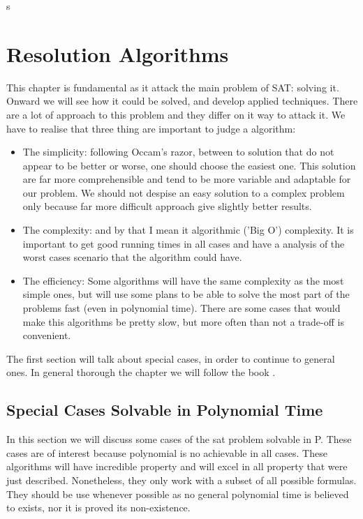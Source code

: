 
s
\chapter{Resolution Algorithms}

This chapter is fundamental as it attack the main problem of SAT: solving it. Onward we will see how it could be solved, and develop applied techniques. There are a lot of approach to this problem and they differ on it way to attack it. We have to realise that three thing are important to judge a algorithm:

\begin{itemize}
\item The simplicity: following Occam's razor, between to solution that do not appear to be better or worse, one should choose the easiest one. This solution are far more comprehensible and tend to be more variable and adaptable for our problem. We should not despise an easy solution to a complex problem only because far more difficult approach give slightly better results.

\item The complexity: and by that I mean it algorithmic ('Big O') complexity. It is important to get good running times in all cases and have a analysis of the worst cases scenario that the algorithm could have.

\item The efficiency: Some algorithms will have the same complexity as the most simple ones, but will use some plans to be able to solve the most part of the problems fast (even in polynomial time). There are some cases that would make this algorithms be pretty slow, but more often than not a trade-off is convenient.
\end{itemize}
  
  The first section will talk about special cases, in order to continue to general ones. In general thorough the chapter we will follow the book \cite{schoning2013satisfiability}.



\section{Special Cases Solvable in Polynomial Time}

In this section we will discuss some cases of the sat problem solvable in P. These cases are of interest because polynomial is no achievable in all cases. These algorithms will have incredible property and will excel in all property that were just described. Nonetheless, they only work with a subset of all possible formulas. They should be use whenever possible as no general polynomial time is believed to exists, nor it is proved its non-existence.

